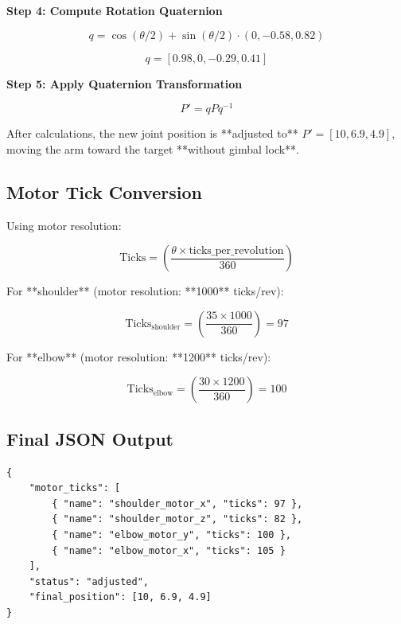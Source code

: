\documentclass{article}
\begin{document}
\textbf{Step 4: Compute Rotation Quaternion}



\[
q = \cos(\theta/2) + \sin(\theta/2) \cdot (0, -0.58, 0.82)
\]





\[
q = [0.98, 0, -0.29, 0.41]
\]



\textbf{Step 5: Apply Quaternion Transformation}



\[
P' = q P q^{-1}
\]



After calculations, the new joint position is **adjusted to** \( P' = [10, 6.9, 4.9] \), moving the arm toward the target **without gimbal lock**.

\subsection{Motor Tick Conversion}
Using motor resolution:



\[
\mathrm{Ticks} = \left(\frac{\theta \times \text{ticks\_per\_revolution}}{360} \right)
\]



For **shoulder** (motor resolution: **1000** ticks/rev):



\[
\mathrm{Ticks}_{\text{shoulder}} = \left(\frac{35 \times 1000}{360} \right) = 97
\]



For **elbow** (motor resolution: **1200** ticks/rev):



\[
\mathrm{Ticks}_{\text{elbow}} = \left(\frac{30 \times 1200}{360} \right) = 100
\]



\subsection{Final JSON Output}
\begin{verbatim}
{
    "motor_ticks": [
        { "name": "shoulder_motor_x", "ticks": 97 },
        { "name": "shoulder_motor_z", "ticks": 82 },
        { "name": "elbow_motor_y", "ticks": 100 },
        { "name": "elbow_motor_x", "ticks": 105 }
    ],
    "status": "adjusted",
    "final_position": [10, 6.9, 4.9]
}
\end{verbatim}
\end{document}
